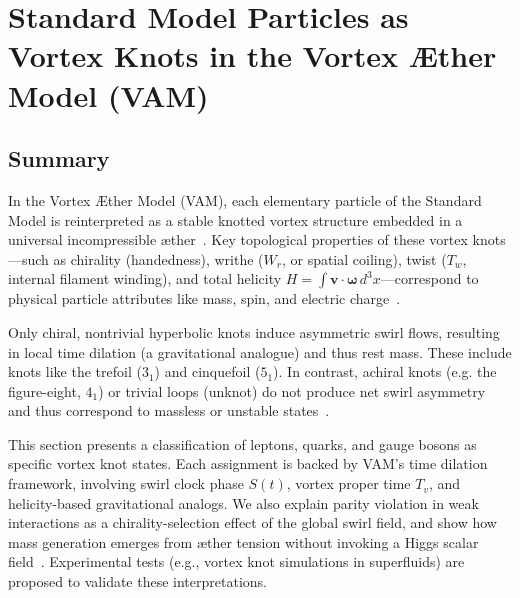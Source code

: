 \documentclass[11pt]{article}
\begin{document}
\medskip

\section*{Standard Model Particles as Vortex Knots in the Vortex Æther Model (VAM)}

\subsection*{Summary}

In the Vortex Æther Model (VAM), each elementary particle of the Standard Model is reinterpreted as a stable knotted vortex structure embedded in a universal incompressible æther~\cite{iskandarani2025vam5}. Key topological properties of these vortex knots—such as chirality (handedness), writhe ($W_r$, or spatial coiling), twist ($T_w$, internal filament winding), and total helicity $H = \int \mathbf{v} \cdot \boldsymbol{\omega} \, d^3x$—correspond to physical particle attributes like mass, spin, and electric charge~\cite{iskandarani2025vam5}.

Only chiral, nontrivial hyperbolic knots induce asymmetric swirl flows, resulting in local time dilation (a gravitational analogue) and thus rest mass. These include knots like the trefoil ($3_1$) and cinquefoil ($5_1$). In contrast, achiral knots (e.g. the figure-eight, $4_1$) or trivial loops (unknot) do not produce net swirl asymmetry and thus correspond to massless or unstable states~\cite{iskandarani2025vam5}.

This section presents a classification of leptons, quarks, and gauge bosons as specific vortex knot states. Each assignment is backed by VAM’s time dilation framework, involving swirl clock phase $S(t)$, vortex proper time $T_v$, and helicity-based gravitational analogs. We also explain parity violation in weak interactions as a chirality-selection effect of the global swirl field, and show how mass generation emerges from æther tension without invoking a Higgs scalar field~\cite{iskandarani2025vam5}. Experimental tests (e.g., vortex knot simulations in superfluids) are proposed to validate these interpretations.
\end{document}
